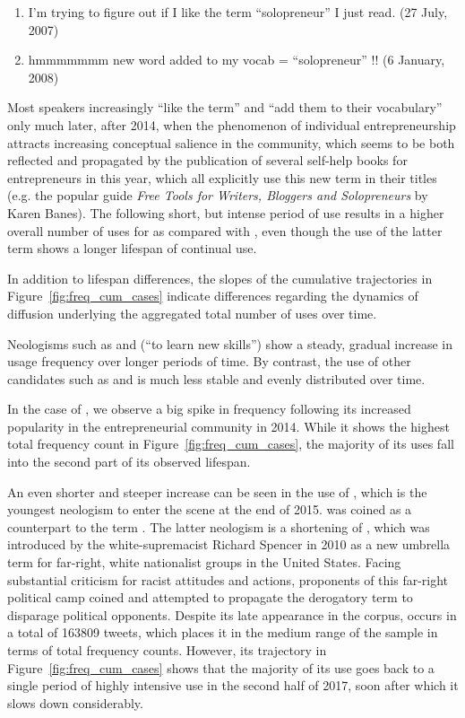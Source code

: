 \documentclass[
  a4paper,
  abstract=on,
  captions=tableabove
  ]{scrartcl}
\begin{document}
      \renewcommand{\labelenumi}{(\arabic{enumi})}
      \begin{enumerate}
        \item I'm trying to figure out if I like the term \enquote{solopreneur} I just read. (27 July, 2007)
        \item hmmmmmmm new word added to my vocab = \enquote{solopreneur} !! (6 January, 2008)
      \end{enumerate}

      Most speakers increasingly \enquote{like the term} and \enquote{add them to their vocabulary} only much later, after 2014, when the phenomenon of individual entrepreneurship attracts increasing conceptual salience in the community, which seems to be both reflected and propagated by the publication of several self-help books for entrepreneurs in this year, which all explicitly use this new term in their titles (e.g. the popular guide \emph{Free Tools for Writers, Bloggers and Solopreneurs} by Karen Banes). The following short, but intense period of use results in a higher overall number of uses for  as compared with , even though the use of the latter term shows a longer lifespan of continual use.

      In addition to lifespan differences, the slopes of the cumulative trajectories in Figure~\ref{fig:freq_cum_cases} indicate differences regarding the dynamics of diffusion underlying the aggregated total number of uses over time.

      Neologisms such as  and  (\enquote{to learn new skills}) show a steady, gradual increase in usage frequency over longer periods of time. By contrast, the use of other candidates such as  and  is much less stable and evenly distributed over time.

      In the case of , we observe a big spike in frequency following its increased popularity in the entrepreneurial community in 2014. While it shows the highest total frequency count in Figure~\ref{fig:freq_cum_cases}, the majority of its uses fall into the second part of its observed lifespan.

      An even shorter and steeper increase can be seen in the use of , which is the youngest neologism to enter the scene at the end of 2015.  was coined as a counterpart to the term . The latter neologism is a shortening of , which was introduced by the white-supremacist Richard Spencer in 2010 as a new umbrella term for far-right, white nationalist groups in the United States. Facing substantial criticism for racist attitudes and actions, proponents of this far-right political camp coined and attempted to propagate the derogatory term  to disparage political opponents. Despite its late appearance in the corpus,  occurs in a total of \num{163809} tweets, which places it in the medium range of the sample in terms of total frequency counts. However, its trajectory in Figure~\ref{fig:freq_cum_cases} shows that the majority of its use goes back to a single period of highly intensive use in the second half of 2017, soon after which it slows down considerably.
\end{document}
